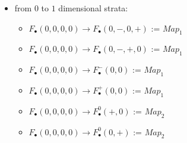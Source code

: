 \begin{itemize}
\item from $0$ to $1$ dimensional strata:
\begin{itemize}
\item $F_\bullet(0,0,0,0)\rightarrow F_\bullet(0,-,0,+)$ := $Map_1$
\item $F_\bullet(0,0,0,0)\rightarrow F_\bullet(0,-,+,0)$ := $Map_1$
\item $F_\bullet(0,0,0,0)\rightarrow F_\bullet^-(0,0)$ := $Map_1$
\item $F_\bullet(0,0,0,0)\rightarrow F_\bullet^+(0,0)$ := $Map_1$
\item $F_\bullet(0,0,0,0)\rightarrow F_\bullet^0(+,0)$ := $Map_2$
\item $F_\bullet(0,0,0,0)\rightarrow F_\bullet^0(0,+)$ := $Map_2$
\end{itemize}


\end{itemize}
